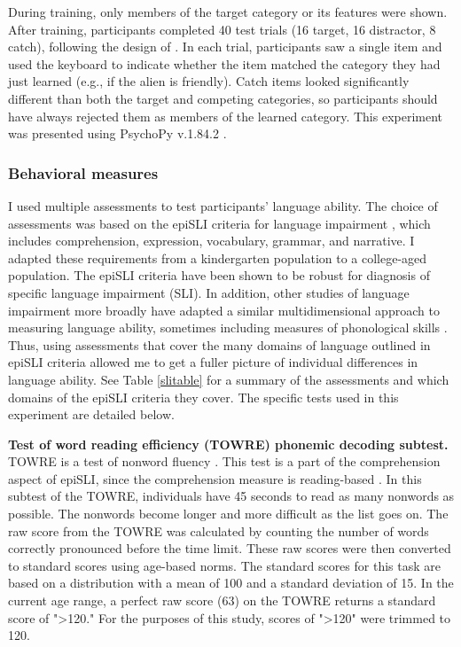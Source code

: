 \documentclass[../dissertation.tex]{subfiles}
\begin{document}
 
 During training, only members of the target category or its features were shown. After training, participants completed 40 test trials (16 target, 16 distractor, 8 catch), following the design of \citet{Kloos2008}. In each trial, participants saw a single item and used the keyboard to indicate whether the item matched the category they had just learned (e.g., if the alien is friendly). Catch items looked significantly different than both the target and competing categories, so participants should have always rejected them as members of the learned category. This experiment was presented using PsychoPy v.1.84.2 \citep{Peirce2007}. \par
 
\subsubsection{Behavioral measures}
	I used multiple assessments to test participants' language ability.  The choice of assessments was based on the epiSLI criteria for language impairment \citep{Tomblin1996}, which includes comprehension, expression, vocabulary, grammar, and narrative. I adapted these requirements from a kindergarten population to a college-aged population. The epiSLI criteria have been shown to be robust for diagnosis of specific language impairment (SLI). In addition, other studies of language impairment more broadly have adapted a similar multidimensional approach to measuring language ability, sometimes including measures of phonological skills \citep{Catts2006}. Thus, using assessments that cover the many domains of language outlined in epiSLI criteria allowed me to get a fuller picture of individual differences in language ability. See Table \ref{slitable} for a summary of the assessments and which domains of the epiSLI criteria they cover. The specific tests used in this experiment are detailed below. \par
	\textbf{Test of word reading efficiency (TOWRE) phonemic decoding subtest.} TOWRE is a test of nonword fluency \citep{Torgesen1992}. This test is a part of the comprehension aspect of epiSLI, since the comprehension measure is reading-based \citep{Gough1986a}. In this subtest of the TOWRE, individuals have 45 seconds to read as many nonwords as possible. The nonwords become longer and more difficult as the list goes on. The raw score from the TOWRE was calculated by counting the number of words correctly pronounced before the time limit. These raw scores were then converted to standard scores using age-based norms. The standard scores for this task are based on a distribution with a mean of 100 and a standard deviation of 15. In the current age range, a perfect raw score (63) on the TOWRE returns a standard score of "\textgreater 120." For the purposes of this study, scores of "\textgreater 120" were trimmed to 120. \par
\end{document}
